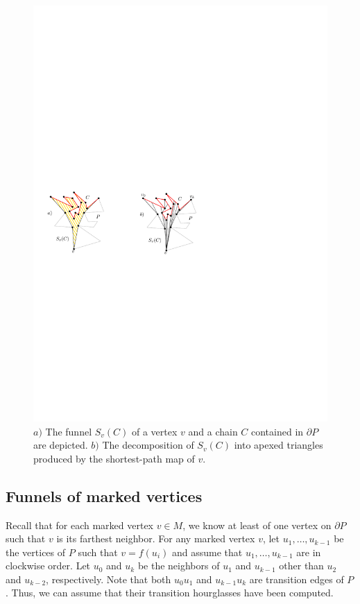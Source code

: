 \documentclass[a4paper,UKenglish]{lipics}
\newcommand{\fn}[2]{\ensuremath{S_{\scriptscriptstyle #1}(#2)}}
\newcommand{\ff}[1]{\ensuremath{f(#1)}}
\begin{document}
\begin{figure}[tb]
\centering
\includegraphics{img/Funnel.pdf}
\caption{\small $a)$ The funnel $\fn{v}{C}$ of a vertex $v$ and a chain $C$ contained in $\partial P$ are depicted.
$b)$ The decomposition of $\fn{v}{C}$ into apexed triangles produced by the shortest-path map of $v$.}
\label{fig:Funnels and decomposition}
\end{figure}

\subsection{Funnels of marked vertices}
Recall that for each marked vertex $v\in M$, we know at least of one vertex on $\partial P$ such that $v$ is its farthest neighbor.
For any marked vertex $v$, let $u_1, \ldots, u_{k-1}$ be the vertices of $P$ such that $v = \ff{u_i}$ and assume that $u_1, \ldots, u_{k-1}$ are in clockwise order. Let $u_0$ and $u_k$ be the neighbors of $u_1$ and $u_{k-1}$ other than $u_2$ and $u_{k-2}$, respectively. Note that both $u_0 u_1$ and $u_{k-1}u_k$ are transition edges of $P$. Thus, we can assume that their transition hourglasses have been computed.
\end{document}
